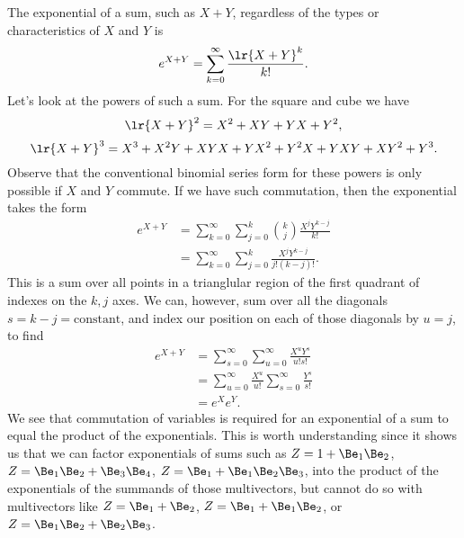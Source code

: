 {
The exponential of a sum, such as \( X + Y \), regardless of the types or characteristics of \( X \) and \( Y \) is
\begin{equation}\label{eqn:2dRotations:1540}
e^{X + Y}
= \sum_{k = 0}^\infty \frac{\lr{X + Y}^k}{k!}.
\end{equation}
Let's look at the powers of such a sum.  For the square and cube we have
\begin{equation}\label{eqn:2dRotations:1560}
\lr{ X + Y}^2 = X^2 + X Y + Y X + Y^2,
\end{equation}
\begin{equation}\label{eqn:2dRotations:1580}
\lr{ X + Y}^3 = X^3 + X^2 Y + X Y X + Y X^2 + Y^2 X + Y X Y + X Y^2 + Y^3.
\end{equation}
Observe that the conventional binomial series form for these powers is only possible if \( X \) and \( Y \) commute.  If we have such commutation, then the exponential takes the form
\begin{equation}\label{eqn:2dRotations:1600}
\begin{aligned}
e^{X + Y}
&= \sum_{k = 0}^\infty \sum_{j = 0}^k \binom{k}{j} \frac{X^j Y^{k-j}}{k!} \\
&= \sum_{k = 0}^\infty \sum_{j = 0}^k \frac{X^j Y^{k-j}}{j!(k - j)!}.
\end{aligned}
\end{equation}
This is a sum over all points in a trianglular region of the first quadrant of indexes on the \( k, j \) axes.
We can, however, sum over all the diagonals \( s = k - j = \textrm{constant} \), and index our position on each of those diagonals by \( u = j \), to find
\begin{equation}\label{eqn:2dRotations:1620}
\begin{aligned}
e^{X + Y}
&= \sum_{s = 0}^\infty \sum_{u = 0}^\infty \frac{X^u Y^{s}}{u!s!} \\
&= \sum_{u = 0}^\infty \frac{X^u}{u!}
   \sum_{s = 0}^\infty \frac{Y^s}{s!} \\
&= e^X e^Y.
\end{aligned}
\end{equation}
We see that commutation of variables is required for an exponential of a sum to equal the product of the exponentials.  This is worth understanding since it shows us that we can factor exponentials of sums such as \( Z = 1 + \Be_1 \Be_2 \), \( Z = \Be_1 \Be_2 + \Be_3 \Be_4 \), \( Z = \Be_1 + \Be_1 \Be_2 \Be_3 \), into the product of the exponentials of the summands of those multivectors, but cannot do so with multivectors like \( Z = \Be_1 + \Be_2 \), \( Z = \Be_1 + \Be_1 \Be_2 \), or \( Z = \Be_1 \Be_2 + \Be_2 \Be_3 \).
}
